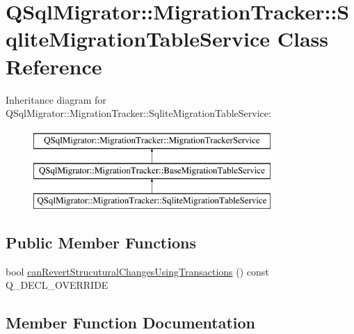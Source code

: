 \hypertarget{class_q_sql_migrator_1_1_migration_tracker_1_1_sqlite_migration_table_service}{}\section{Q\+Sql\+Migrator\+:\+:Migration\+Tracker\+:\+:Sqlite\+Migration\+Table\+Service Class Reference}
\label{class_q_sql_migrator_1_1_migration_tracker_1_1_sqlite_migration_table_service}
Inheritance diagram for Q\+Sql\+Migrator\+:\+:Migration\+Tracker\+:\+:Sqlite\+Migration\+Table\+Service\+:\begin{figure}[H]
\begin{center}
\leavevmode
\includegraphics[height=3.000000cm]{class_q_sql_migrator_1_1_migration_tracker_1_1_sqlite_migration_table_service}
\end{center}
\end{figure}
\subsection*{Public Member Functions}
\begin{DoxyCompactItemize}
\item 
bool \hyperlink{class_q_sql_migrator_1_1_migration_tracker_1_1_sqlite_migration_table_service_a6d2f747ce2a599033dee174f8e996fff}{can\+Revert\+Strucutural\+Changes\+Using\+Transactions} () const Q\+\_\+\+D\+E\+C\+L\+\_\+\+O\+V\+E\+R\+R\+I\+DE
\end{DoxyCompactItemize}


\subsection{Member Function Documentation}
\mbox{\label{class_q_sql_migrator_1_1_migration_tracker_1_1_sqlite_migration_table_service_a6d2f747ce2a599033dee174f8e996fff}} 
